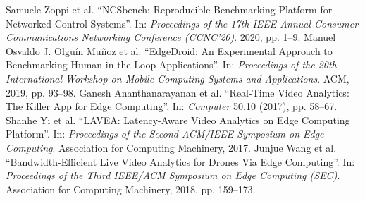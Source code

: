 \documentclass[sigconf,9pt,natbib=false]{acmart}
\begin{document}
\begin{thebibliography}{99}
  Samuele Zoppi et al. “{NCSbench}: Reproducible Benchmarking Platform for Networked Control Systems”. In: \emph{Proceedings of the {17th} IEEE Annual Consumer Communications Networking Conference (CCNC’20)}. 2020, pp. 1–9.
  Manuel Osvaldo J. Olguín Muñoz et al. “{EdgeDroid: An Experimental Approach to Benchmarking Human-in-the-Loop Applications}”. In: \emph{Proceedings of the 20th International Workshop on Mobile Computing Systems and Applications}. ACM, 2019, pp. 93–98.
  Ganesh Ananthanarayanan et al. “Real-Time Video Analytics: The Killer App for Edge Computing”. In: \emph{Computer} 50.10 (2017), pp. 58–67.
  Shanhe Yi et al. “LAVEA: Latency-Aware Video Analytics on Edge Computing Platform”. In: \emph{Proceedings of the Second ACM/IEEE Symposium on Edge Computing}. Association for Computing Machinery, 2017.
  Junjue Wang et al. “Bandwidth-Efficient Live Video Analytics for Drones Via Edge Computing”. In: \emph{Proceedings of the Third IEEE/ACM Symposium on Edge Computing (SEC)}. Association for Computing Machinery, 2018, pp. 159–173.
\end{thebibliography}
\end{document}
